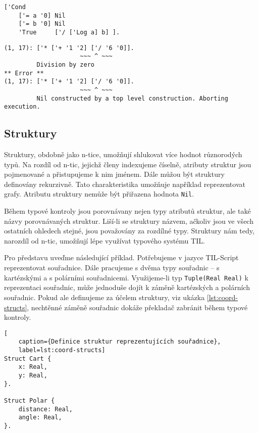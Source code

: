 \begin{lstlisting}[caption={Příklad využití Nil}]
['Cond
    ['= a '0] Nil
    ['= b '0] Nil
    'True     ['/ ['Log a] b] ].
\end{lstlisting}

\begin{lstlisting}[caption={Příklad hlášení chyby}]
(1, 17): ['* ['+ '1 '2] ['/ '6 '0]].
                     ~~~ ^ ~~~
         Division by zero
** Error **
(1, 17): ['* ['+ '1 '2] ['/ '6 '0]].
                     ~~~ ^ ~~~
         Nil constructed by a top level construction. Aborting execution.
\end{lstlisting}

\subsection{Struktury}\label{structs}

Struktury, obdobně jako n-tice, umožňují shlukovat více hodnot různorodých typů. Na rozdíl od n-tic,
jejichž členy indexujeme číselně, atributy struktur jsou pojmenované a přistupujeme k nim jménem.
Dále můžou být struktury definovány rekurzivně. Tato charakteristika umožňuje například
reprezentovat grafy. Atributu struktury nemůže být přiřazena hodnota \lstinline{Nil}.

Během typové kontroly jsou porovnávany nejen typy atributů struktur, ale také názvy porovnávaných
struktur. Liší-li se struktury názvem, ačkoliv jsou ve všech ostatních ohledech stejné, jsou
považovány za rozdílné typy. Struktury nám tedy, narozdíl od n-tic, umožňují lépe využívat typového
systému TIL.

Pro představu uveďme následující příklad. Potřebujeme v jazyce TIL-Script reprezentovat souřadnice.
Dále pracujeme s dvěma typy souřadnic -- s kartézskými a s polárními souřadnicemi. Využijeme-li
typ \lstinline{Tuple(Real Real)} k reprezentaci souřadnic, může jednoduše dojít k záměně
kartézských a polárních souřadnic. Pokud ale definujeme za účelem struktury, viz ukázka
\ref{lst:coord-structs}, nechtěnné záměně souřadnic dokáže překladač zabránit během typové
kontroly.

\begin{lstlisting}[
    caption={Definice struktur reprezentujících souřadnice},
    label=lst:coord-structs]
Struct Cart {
    x: Real,
    y: Real,
}.

Struct Polar {
    distance: Real,
    angle: Real,
}.
\end{lstlisting}

